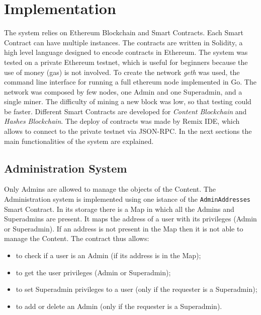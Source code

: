 \documentclass[hidelinks,conference,compsoc]{IEEEtran}
\begin{document}
\section{Implementation}
\label{Implementation}
The system relies on Ethereum Blockchain and Smart Contracts. Each Smart Contract can have multiple instances. 
The contracts are written in Solidity, a high level language designed to encode contracts in Ethereum. The system was tested on a private Ethereum testnet, which is useful for beginners because the use of money (gas) is not involved. To create the network \textit{geth} was used, the command line interface for running a full ethereum node implemented in Go. The network was composed by few nodes, one Admin and one Superadmin, and a single miner. The difficulty of mining a new block was low, so that testing could be faster.
Different Smart Contracts are developed for \textit{Content Blockchain} and \textit{Hashes Blockchain}. The deploy of contracts was made by Remix IDE, which allows to connect to the private testnet via JSON-RPC.
In the next sections the main functionalities of the system are explained.

\subsection{Administration System}
Only Admins are allowed to manage the objects of the Content. The Administration system is implemented using one istance of the \texttt{AdminAddresses} Smart Contract. In its storage there is a Map in which all the Admins and Superadmins are present. It maps the address of a user with its privileges (Admin or Superadmin). If an address is not present in the Map then it is not able to manage the Content. The contract thus allows:
\begin{itemize}
	\item to check if a user is an Admin (if its address is in the Map);
	\item to get the user privileges (Admin or Superadmin);
	\item to set Superadmin privileges to a user (only if the requester is a Superadmin);
	\item to add or delete an Admin (only if the requester is a Superadmin).
\end{itemize}   
\end{document}
